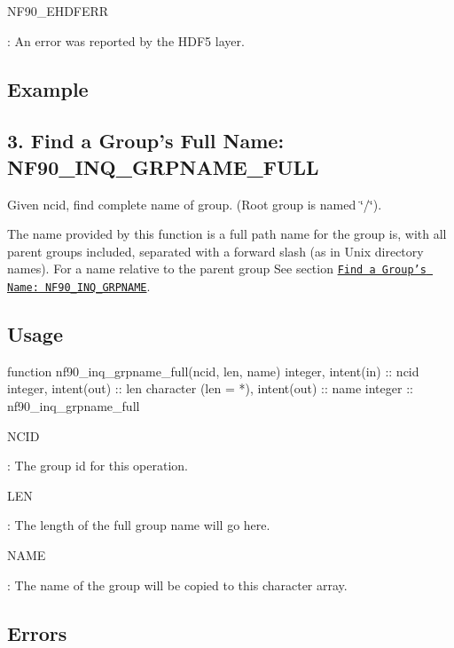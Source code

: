 {\ttfamily N\+F90\+\_\+\+E\+H\+D\+F\+E\+RR}

\+: An error was reported by the H\+D\+F5 layer.

\subsection*{Example}\hypertarget{f90_groups_f90-find-a-groups-full-name-nf90_inq_grpname_full}{}\subsection{3. Find a Group’s Full Name\+: N\+F90\+\_\+\+I\+N\+Q\+\_\+\+G\+R\+P\+N\+A\+M\+E\+\_\+\+F\+U\+L\+L }\label{f90_groups_f90-find-a-groups-full-name-nf90_inq_grpname_full}
Given ncid, find complete name of group. (Root group is named \char`\"{}/\char`\"{}).

The name provided by this function is a full path name for the group is, with all parent groups included, separated with a forward slash (as in Unix directory names). For a name relative to the parent group See section \href{#f90-find-a-groups-name-nf90_inq_grpname}{\tt Find a Group’s Name\+: N\+F90\+\_\+\+I\+N\+Q\+\_\+\+G\+R\+P\+N\+A\+ME}.

\subsection*{Usage}


\begin{DoxyCode}
\textcolor{keyword}{function }nf90\_inq\_grpname\_full(ncid, len, name)
  \textcolor{keywordtype}{integer}, \textcolor{keywordtype}{intent(in)} :: ncid
  \textcolor{keywordtype}{integer}, \textcolor{keywordtype}{intent(out)} :: len
  \textcolor{keywordtype}{character (len = *)}, \textcolor{keywordtype}{intent(out)} :: name
  \textcolor{keywordtype}{integer} :: nf90\_inq\_grpname\_full
\end{DoxyCode}


{\ttfamily N\+C\+ID}

\+: The group id for this operation.

{\ttfamily L\+EN}

\+: The length of the full group name will go here.

{\ttfamily N\+A\+ME}

\+: The name of the group will be copied to this character array.

\subsection*{Errors}

